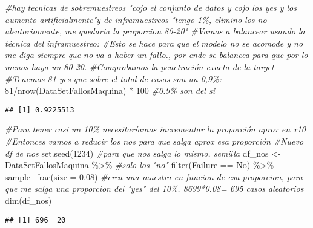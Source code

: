 \documentclass[
]{article}
\newenvironment{Shaded}{\begin{snugshade}}{\end{snugshade}}
\newcommand{\AttributeTok}[1]{\textcolor[rgb]{0.77,0.63,0.00}{#1}}
\newcommand{\CommentTok}[1]{\textcolor[rgb]{0.56,0.35,0.01}{\textit{#1}}}
\newcommand{\DecValTok}[1]{\textcolor[rgb]{0.00,0.00,0.81}{#1}}
\newcommand{\FloatTok}[1]{\textcolor[rgb]{0.00,0.00,0.81}{#1}}
\newcommand{\FunctionTok}[1]{\textcolor[rgb]{0.00,0.00,0.00}{#1}}
\newcommand{\NormalTok}[1]{#1}
\newcommand{\OtherTok}[1]{\textcolor[rgb]{0.56,0.35,0.01}{#1}}
\newcommand{\SpecialCharTok}[1]{\textcolor[rgb]{0.00,0.00,0.00}{#1}}
\newcommand{\StringTok}[1]{\textcolor[rgb]{0.31,0.60,0.02}{#1}}
\begin{document}
\begin{Shaded}
\begin{Highlighting}[]
\CommentTok{\#hay tecnicas de sobremuestreos "cojo el conjunto de datos y cojo los yes y los aumento artificialmente"y de inframuestreos "tengo 1\%, elimino los no aleatoriomente, me quedaria la proporcion 80{-}20"}
\CommentTok{\#Vamos a balancear usando la técnica del inframuestreo:}
\CommentTok{\#Esto se hace para que el modelo no se acomode y no me diga siempre que no va a haber un fallo., por ende se balancea para que por lo menos haya un 80{-}20.}
\CommentTok{\#Comprobamos la penetración exacta de la target}
\CommentTok{\#Tenemos 81 yes que sobre el total de casos son un 0,9\%:}
\DecValTok{81}\SpecialCharTok{/}\FunctionTok{nrow}\NormalTok{(DataSetFallosMaquina) }\SpecialCharTok{*} \DecValTok{100} \CommentTok{\#0.9\% son del si}
\end{Highlighting}
\end{Shaded}

\begin{verbatim}
## [1] 0.9225513
\end{verbatim}

\begin{Shaded}
\begin{Highlighting}[]
\CommentTok{\#Para tener casi un 10\% necesitaríamos incrementar la proporción aprox en x10}
\CommentTok{\#Entonces vamos a reducir los nos para que salga aprox esa proporción}
\CommentTok{\#Nuevo df de nos}
\FunctionTok{set.seed}\NormalTok{(}\DecValTok{1234}\NormalTok{) }\CommentTok{\#para que nos salga lo mismo, semilla}
\NormalTok{df\_nos }\OtherTok{\textless{}{-}}\NormalTok{ DataSetFallosMaquina }\SpecialCharTok{\%\textgreater{}\%} \CommentTok{\#solo los "no"}
  \FunctionTok{filter}\NormalTok{(Failure }\SpecialCharTok{==} \StringTok{\textquotesingle{}No\textquotesingle{}}\NormalTok{) }\SpecialCharTok{\%\textgreater{}\%}
  \FunctionTok{sample\_frac}\NormalTok{(}\AttributeTok{size =} \FloatTok{0.08}\NormalTok{) }\CommentTok{\#crea una muestra en funcion de esa proporcion, para que me salga una proporcion del "yes" del 10\%. 8699*0.08= 695 casos aleatorios}
\FunctionTok{dim}\NormalTok{(df\_nos)}
\end{Highlighting}
\end{Shaded}

\begin{verbatim}
## [1] 696  20
\end{verbatim}
\end{document}
